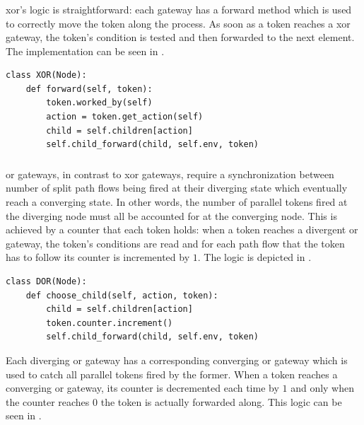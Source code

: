 \subsubsection{}

\gls{xor}'s logic is straightforward: each gateway has a forward method which is used to correctly move the token along the process. As soon as a token reaches a \gls{xor} gateway, the token's condition is tested and then forwarded to the next element. The implementation can be seen in . 

\begin{lstlisting}[caption=\glsentryshort{xor}'s forward method,label=lst:xor_forward,style=CustomPython]
class XOR(Node):
    def forward(self, token):
        token.worked_by(self)
        action = token.get_action(self)
        child = self.children[action]
        self.child_forward(child, self.env, token)
\end{lstlisting}

\subsubsection{}

\gls{or} gateways, in contrast to \gls{xor} gateways, require a synchronization between number of split path flows being fired at their diverging state which eventually reach a converging state. In other words, the number of parallel tokens fired at the diverging node must all be accounted for at the converging node. This is achieved by a counter that each token holds: when a token reaches a divergent \gls{or} gateway, the token's conditions are read and for each path flow that the token has to follow its counter is incremented by $1$. The logic is depicted in .

\begin{lstlisting}[caption=Token's counter increment logic at a divergent \glsentryshort{or} gateway,label=lst:or_counter_increment,style=CustomPython]
class DOR(Node):
    def choose_child(self, action, token):
        child = self.children[action]
        token.counter.increment()
        self.child_forward(child, self.env, token)
\end{lstlisting}

Each diverging \gls{or} gateway has a corresponding converging \gls{or} gateway which is used to catch all parallel tokens fired by the former. When a token reaches a converging \gls{or} gateway, its counter is decremented each time by $1$ and only when the counter reaches $0$ the token is actually forwarded along. This logic can be seen in .

